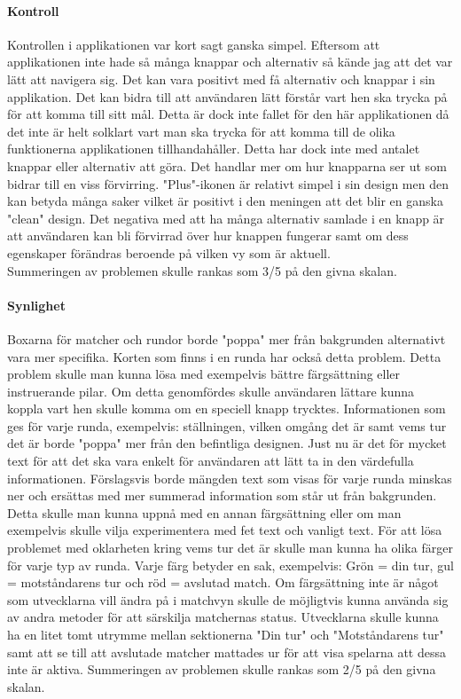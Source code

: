 \documentclass[a4paper, 11pt]{article}
\begin{document}
\paragraph{Kontroll}
Kontrollen i applikationen var kort sagt ganska simpel. Eftersom att applikationen inte hade så många knappar och alternativ så kände jag att det var lätt att navigera sig. Det kan vara positivt med få alternativ och knappar i sin applikation. Det kan bidra till att användaren lätt förstår vart hen ska trycka på för att komma till sitt mål. Detta är dock inte fallet för den här applikationen då det inte är helt solklart vart man ska trycka för att komma till de olika funktionerna applikationen tillhandahåller. Detta har dock inte med antalet knappar eller alternativ att göra. Det handlar mer om hur knapparna ser ut som bidrar till en viss förvirring.
"Plus"-ikonen är relativt simpel i sin design men den kan betyda många saker vilket är positivt i den meningen att det blir en ganska "clean" design. Det negativa med att ha många alternativ samlade i en knapp är att användaren kan bli förvirrad över hur knappen fungerar samt om dess egenskaper förändras beroende på vilken vy som är aktuell.\\
Summeringen av problemen skulle rankas som 3/5 på den givna skalan.

\paragraph{Synlighet}
Boxarna för matcher och rundor borde "poppa" mer från bakgrunden alternativt vara mer specifika. Korten som finns i en runda har också detta problem. Detta problem skulle man kunna lösa med exempelvis bättre färgsättning eller instruerande pilar. Om detta genomfördes skulle användaren lättare kunna koppla vart hen skulle komma om en speciell knapp trycktes.
Informationen som ges för varje runda, exempelvis: ställningen, vilken omgång det är samt vems tur det är borde "poppa" mer från den befintliga designen. Just nu är det för mycket text för att det ska vara enkelt för användaren att lätt ta in den värdefulla informationen. Förslagsvis borde mängden text som visas för varje runda minskas ner och ersättas med mer summerad information som står ut från bakgrunden. Detta skulle man kunna uppnå med en annan färgsättning eller om man exempelvis skulle vilja experimentera med fet text och vanligt text. 
För att lösa problemet med oklarheten kring vems tur det är skulle man kunna ha olika färger för varje typ av runda. Varje färg betyder en sak, exempelvis: Grön = din tur, gul = motståndarens tur och röd = avslutad match. Om färgsättning inte är något som utvecklarna vill ändra på i matchvyn skulle de möjligtvis kunna använda sig av andra metoder för att särskilja matchernas status. Utvecklarna skulle kunna ha en litet tomt utrymme mellan sektionerna "Din tur" och "Motståndarens tur" samt att se till att avslutade matcher mattades ur för att visa spelarna att dessa inte är aktiva.
Summeringen av problemen skulle rankas som 2/5 på den givna skalan.    
\end{document}
